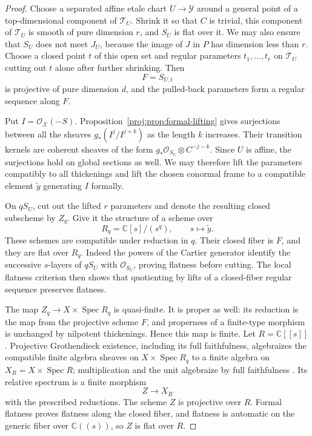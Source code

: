\documentclass[11pt,letterpaper]{article}
\newcommand{\C}{\mathbb{C}}
\newcommand{\OO}{\mathcal{O}}
\DeclareMathOperator{\Spec}{Spec}
\theoremstyle{definition}
\theoremstyle{remark}
\begin{document}
\begin{proof}
Choose a separated affine etale chart $U\to\mathcal Y$
around a general point of a top-dimensional component of
$\mathcal T_U$.  Shrink it so that $C$ is trivial, this
component of $\mathcal T_U$ is smooth of pure dimension $r$,
and $S_U$ is flat over it.  We may also ensure that $S_U$
does not meet $J_U$, because the image of $J$ in $P$ has
dimension less than $r$.  Choose a closed point $t$ of this
open set and regular parameters $t_1,\ldots,t_r$ on
$\mathcal T_U$ cutting out $t$ alone after further shrinking.
Then
\[
 F=S_{U,t}
\]
is projective of pure dimension $d$, and the pulled-back
parameters form a regular sequence along $F$.

Put $I=\OO_{\mathcal X}(-S)$.  Proposition~\ref{proj:prop:formal-lifting}
gives surjections between all the sheaves
$g_*(I^j/I^{j+k})$ as the length $k$ increases.
Their transition kernels are coherent sheaves of the form
$g_*\OO_{S_U}\otimes C^{-j-k}$.  Since $U$ is affine, the
surjections hold on global sections as well.  We may
therefore lift the parameters compatibly to all
thickenings and lift the chosen conormal frame to a
compatible element $\widetilde y$ generating $I$ formally.

On $qS_U$, cut out the lifted $r$ parameters and denote the
resulting closed subscheme by $Z_q$.  Give it the structure
of a scheme over
\[
 R_q=\C[s]/(s^q),\qquad s\longmapsto\widetilde y.
\]
These schemes are compatible under reduction in $q$.
Their closed fiber is $F$, and they are flat over $R_q$.
Indeed the powers of the Cartier generator identify the
successive $s$-layers of $qS_U$ with $\OO_{S_U}$, proving
flatness before cutting.  The local flatness criterion then
shows that quotienting by lifts of a closed-fiber regular
sequence preserves flatness.

The map
$Z_q\to X\times\Spec R_q$ is quasi-finite.
It is proper as well: its reduction is the map from the
projective scheme $F$, and properness of a finite-type
morphism is unchanged by nilpotent thickenings.  Hence
this map is finite.  Let $R=\C[[s]]$.  Projective
Grothendieck existence, including its full faithfulness,
algebraizes the compatible finite algebra sheaves on
$X\times\Spec R_q$ to a finite algebra on
$X_R=X\times\Spec R$; multiplication and the unit
algebraize by full faithfulness
\cite[Lemmas~30.24.1 and~30.24.3]{Proj-StacksExistence}.
Its relative spectrum is a finite morphism
\[
 Z\longrightarrow X_R
\]
with the prescribed reductions.  The scheme $Z$ is
projective over $R$.  Formal flatness proves flatness
along the closed fiber, and flatness is automatic on the
generic fiber over $\C((s))$, so $Z$ is flat over $R$.


\end{proof}
\end{document}
